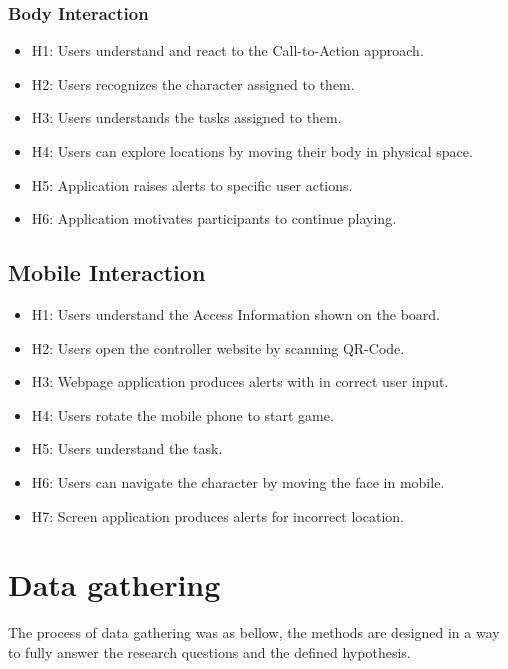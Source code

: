 \subsubsection{Body Interaction}

\begin{itemize}

\item H1: Users understand and react to the Call-to-Action approach.
\item H2: Users recognizes the character assigned to them.
\item H3: Users understands the tasks assigned to them.
\item H4: Users can explore locations by moving their body in physical space.
\item H5: Application raises alerts to specific user actions.
\item H6: Application motivates participants to continue playing.
\end{itemize}

\subsection{Mobile Interaction}

\begin{itemize}
\item H1: Users understand the Access Information shown on the board.
\item H2: Users open the controller website by scanning QR-Code.
\item H3: Webpage application produces alerts with in correct user input.
\item H4: Users rotate the mobile phone to start game.
\item H5: Users understand the task.
\item H6: Users can navigate the character by moving the face in mobile.
\item H7: Screen application produces alerts for incorrect location.
\end{itemize}






\section{Data gathering}
The process of data gathering was as bellow, the methods are designed in a way to fully answer the research questions and the defined hypothesis.

